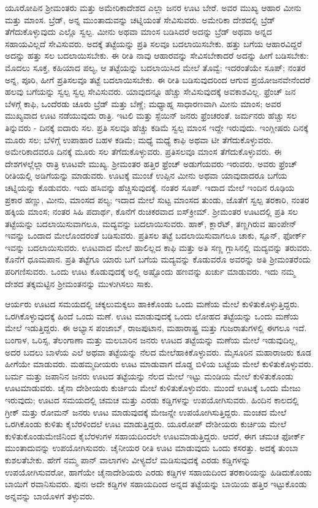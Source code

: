 ಯೂರೋಪಿನ ಶ‍್ರೀಮಂತರು ಮತ್ತು ಅಮೇರಿಕಾದೇಶದ ಎಲ್ಲಾ ಜನರ ಊಟ ಬೇರೆ. ಅವರ ಮುಖ್ಯ ಆಹಾರ ಮೀನು ಮತ್ತು ಮಾಂಸ. ಬ್ರೆಡ್​, ಅನ್ನ ಮುಂತಾದುವನ್ನು ಚಟ್ನಿಯಂತೆ ಸೇವಿಸುವರು. ಅಮೇರಿಕಾ ದೇಶದಲ್ಲಿ ಬ್ರೆಡ್​ ತೆಗೆದುಕೊಳ್ಳುವುದು ಎಲ್ಲೊ ಸ್ವಲ್ಪ. ಮೀನು ಅಥವಾ ಮಾಂಸ ಬಡಿಸಿದರೆ ಅದನ್ನು ಬ್ರೆಡ್​ ಅಥವಾ ಅನ್ನದ ಸಹಾಯವಿಲ್ಲದೆ ಸೇವಿಸುವರು. ಅದಕ್ಕೆ ತಟ್ಟೆಯನ್ನು ಪ್ರತಿ ಸಲವೂ ಬದಲಾಯಿಸಬೇಕು. ಹತ್ತು ಬಗೆಯ ಆಹಾರವಿದ್ದರೆ ಅದನ್ನು ಹತ್ತು ಸಲ ಬದಲಾಯಿಸಬೇಕು. ಈ ರೀತಿ ನಾವು ಆಹಾರವನ್ನು ಸೇವಿಸಬೇಕಾದರೆ ಅದನ್ನು ಹೀಗೆ ಬಡಿಸಬೇಕು: ಮೊದಲು ಸೂಕ್ತ, ಕಹಿಯಾದ ಪಲ್ಯ, ಆ ತಟ್ಟೆಯನ್ನು ಬದಲಾಯಿಸಿದ ಮೇಲೆ ತೊವ್ವೆ; ಇದರಂತೆಯೇ ಸೂಪ್​; ನಂತರ ಅನ್ನ, ಪೂರಿ, ಹೀಗೆ ಪ್ರತಿಸಲವೂ ತಟ್ಟೆ ಬದಲಾಯಿಸಬೇಕು. ಈ ರೀತಿ ಬಡಿಸುವುದರಿಂದ ಆಗುವ ಪ್ರಯೋಜನವೇನೆಂದರೆ ಹಲವು ಬಗೆಯನ್ನು ಸ್ವಲ್ಪ ಸ್ವಲ್ಪ ಸೇವಿಸುವರು. ಯಾವುದನ್ನೂ ಹೆಚ್ಚು ಸೇವಿಸುವುದಕ್ಕೆ ಅವಕಾಶವಿಲ್ಲ. ಫ್ರೆಂಚ್​ ಜನ ಬೆಳಗ್ಗೆ ಕಾಫಿ, ಒಂದೆರಡು ಚೂರು ಬ್ರೆಡ್​ ಮತ್ತು ಬೆಣ್ಣೆ; ಮಧ್ಯಾಹ್ನ ಸಾಧಾರಣವಾಗಿ ಮೀನು ಮಾಂಸ; ಅವರ ಮುಖ್ಯವಾದ ಊಟ ನಡೆಯುವುದು ರಾತ್ರಿ. ಇಟಲಿ ಮತ್ತು ಸ್ಪೆಯಿನ್​ ಜನರು ಫ್ರೆಂಚರಂತೆ. ಜರ್ಮನರು ಹೆಚ್ಚು ಸಲ ತಿನ್ನುವರು - ದಿನಕ್ಕೆ ಐದಾರು ಸಲ. ಪ್ರತಿ ಸಲವೂ ಹೆಚ್ಚು ಕಡಿಮೆ ಸ್ವಲ್ಪ ಮಾಂಸ ಇದ್ದೇ ಇರುವುದು. ಇಂಗ್ಲೀಷರು ದಿನಕ್ಕೆ ಮೂರು ಸಲ; ಬೆಳಿಗ್ಗೆ ಉಪಾಹಾರ ಬಹಳ ಕಡಿಮೆ; ಮಧ್ಯೆ ಮಧ್ಯೆ ಕಾಫಿ ಅಥವಾ ಟೀ ತೆಗೆದುಕೊಳ್ಳುವರು. ಅಮೇರಿಕಾದವರೂ ದಿನಕ್ಕೆ ಮೂರು ಸಲ ತೆಗೆದುಕೊಳ್ಳುವರು. ಪ್ರತಿಸಲವೂ ಮಾಂಸ ತೆಗೆದುಕೊಳ್ಳುವರು. ಈ ದೇಶಗಳಲ್ಲೆಲ್ಲಾ ರಾತ್ರಿ ಊಟವೇ ಮುಖ್ಯ. ಶ‍್ರೀಮಂತರ ಹತ್ತಿರ ಫ್ರೆಂಚ್​ ಅಡುಗೆಯವರು ಇರುವರು. ಅವರು ಫ್ರೆಂಚ್ ರೀತಿಯಲ್ಲಿ ಅಡಿಗೆಯನ್ನು ಮಾಡುವರು. ಊಟಕ್ಕೆ ಮುಂಚೆ ಉಪ್ಪಿನ ಮೀನು ಅಥವಾ ಯಾವುದಾದರೂ ಬಗೆಯ ಚಟ್ನಿಯನ್ನು ಕೊಡುವರು. ಇದು ಹಸಿವನ್ನು ಹೆಚ್ಚಿಸುವುದಕ್ಕೆ. ನಂತರ ಸೂಪ್​. ಇದಾದ ಮೇಲೆ ಇಂದಿನ ರೂಢಿಯ ಪ್ರಕಾರ ಹಣ್ಣು, ಮೀನು, ಮಾಂಸದ ಪಲ್ಯ; ಇದಾದ ಮೇಲೆ ಸುಟ್ಟ ಮಾಂಸದ ತುಂಡು, ಜೊತೆಗೆ ಸ್ವಲ್ಪ ತರಕಾರಿ, ನಂತರ ಹಕ್ಕಿಯ ಮಾಂಸ; ನಂತರ ಸಿಹಿ ಪದಾರ್ಥ, ಕೊನೆಗೆ ರುಚಿಕರವಾದ ಐಸ್​ಕ್ರೀಮ್​. ಶ‍್ರೀಮಂತರ ಊಟದಲ್ಲಿ ಪ್ರತಿ ಸಲ ತಟ್ಟೆಯನ್ನು ಬದಲಾಯಿಸುವಾಗಲೂ, ಮದ್ಯವನ್ನು ಬದಲಾಯಿಸುವರು. ಹಾಕ್​, ಕ್ಲಾರೆಟ್​, ತಣ್ಣಗಿರುವ ಷಾಂಪೇನ್​ ಇವನ್ನು ಒಂದಾದ ಮೇಲೊಂದರಂತೆ ಬಡಿಸುವರು. ಪ್ರತಿಸಲ ತಟ್ಟೆ ಬದಲಾಯಿಸುವಾಗಲೂ ಚಾಕು, ಸ್ಪೂನ್​, ಫೋರ್ಕ್​ ಇವನ್ನು ಬದಲಾಯಿಸುವರು. ಊಟವಾದ ಮೇಲೆ ಹಾಲಿಲ್ಲದ ಕಾಫಿ ಮತ್ತು ಅತಿ ಸಣ್ಣ ಗ್ಲಾಸಿನಲ್ಲಿ ಮದ್ಯವನ್ನು ತರುವರು. ಕೊನೆಗೆ ಧೂಮಪಾನ. ಪ್ರತಿ ತಟ್ಟೆಗೂ ಯಾರು ಬಗೆ ಬಗೆಯ ಮದ್ಯವನ್ನು ಕೊಡುವರೊ ಅವರನ್ನು ಅತಿ ಶ‍್ರೀಮಂತರೆಂದು ಪರಿಗಣಿಸುವರು. ಒಂದು ಊಟ ಕೊಡುವುದಕ್ಕೆ ಅಲ್ಲಿ ಅಷ್ಟೊಂದು ಹಣವನ್ನು ಖರ್ಚು ಮಾಡುವರು. ಇದು ನಮ್ಮ ದೇಶದ ತಕ್ಕಮಟ್ಟಿನ ಶ‍್ರೀಮಂತನನ್ನು ಮುಳುಗಿಸಲು ಸಾಕು.

ಆರ್ಯರು ಊಟದ ಸಮಯದಲ್ಲಿ ಚಕ್ಕಲುಮಕ್ಕಲು ಹಾಕಿಕೊಂಡು ಒಂದು ಮಣೆಯ ಮೇಲೆ ಕುಳಿತುಕೊಳ್ಳುತ್ತಿದ್ದರು. ಒರಗಿಕೊಳ್ಳುವುದಕ್ಕೆ ಹಿಂದೆ ಒಂದು ಮಣೆ. ಊಟ ಮಾಡುವುದಕ್ಕೆ ಒಂದು ಲೋಹದ ತಟ್ಟೆಯನ್ನು ಒಂದು ಮಣೆಯ ಮೇಲೆ ಇಡುತ್ತಿದ್ದರು. ಈ ಅಭ್ಯಾಸ ಪಂಜಾಬ್​, ರಾಜಪುಟಾನ, ಮಹಾರಾಷ್ಟ್ರ ಮತ್ತು ಗುಜರಾತುಗಳಲ್ಲಿ ಈಗಲೂ ಇದೆ. ಬಂಗಾಳ, ಒರಿಸ್ಸ, ತೆಲಂಗಾಣಾ ಮತ್ತು ಮಲಬಾರಿನ ಜನರು ಊಟದ ತಟ್ಟೆಯನ್ನು ಮಣೆಯ ಮೇಲೆ ಇಡುವುದಿಲ್ಲ, ಅದರ ಬದಲು ಬಾಳೆಯ ಎಲೆ ಅಥವಾ ತಟ್ಟೆಯನ್ನು ನೆಲದ ಮೇಲೆಹಾಕಿಕೊಳ್ಳುವರು. ಮೈಸೂರಿನ ಮಹಾರಾಜರು ಕೂಡ ಹೀಗೆಯೇ ಮಾಡುವರು. ಮಹಮ್ಮದೀಯರು ಊಟ ಮಾಡುವಾಗ ದೊಡ್ಡ ಬಿಳಿಯ ಬಟ್ಟೆಯ ಮೇಲೆ ಕುಳಿತುಕೊಳ್ಳುವರು. ಬರ್ಮ ಮತ್ತು ಜಪಾನಿನ ಜನರು ಊಟದ ತಟ್ಟೆಯನ್ನು ನೆಲದ ಮೇಲೆ ಇಟ್ಟು ಮಂಡಿಯ ಮೇಲೆ ಕುಳಿತುಕೊಂಡು ಊಟಮಾಡುವರು. ಚೈನಾ ದೇಶೀಯರು ಕುರ್ಚಿಯ ಮೇಲೆ ಕುಳಿತುಕೊಳ್ಳುವರು. ಮುಂದೆ ಊಟಕ್ಕೆ ಒಂದು ಮೇಜು ಇರುವುದು; ಊಟದ ಸಮಯದಲ್ಲಿ ಚಮಚ ಮತ್ತು ಎರಡು ಕಡ್ಡಿಗಳನ್ನು ಉಪಯೋಗಿಸುವರು. ಹಿಂದಿನ ಕಾಲದಲ್ಲಿ ಗ್ರೀಕ್​ ಮತ್ತು ರೋಮನ್​ ಜನರು ಊಟ ಮಾಡುವುದಕ್ಕೆ ಮೇಜನ್ನೇ ಉಪಯೋಗಿಸುತ್ತಿದ್ದರು. ಮಂಚದ ಮೇಲೆ ಒರಗಿಕೊಂಡು ಕುಳಿತು ಕೈಬೆರಳಿಂದಲೆ ಊಟ ಮಾಡುತ್ತಿದ್ದರು. ಯೂರೋಪ್​ ದೇಶೀಯರು ಕುರ್ಚಿಯ ಮೇಲೆ ಕುಳಿತುಕೊಂಡು\break ಮೇಜಿನಿಂದ ಕೈಬೆರಳುಗಳ ಸಹಾಯದಿಂದಲೇ ಊಟಮಾಡುತ್ತಿದ್ದರು. ಆದರೆ, ಈಗ ಚಮಚ ಫೋರ್ಕ್​ ಮುಂತಾದುವನ್ನು ಉಪಯೋಗಿಸುವರು. ಚೈನೀಯರ ರೀತಿ ಊಟ ಮಾಡುವುದು ಒಂದು ಕಸರತ್ತು. ಅದಕ್ಕೆ ತುಂಬಾ ಕುಶಲತೆಬೇಕು. ಹೇಗೆ ನಮ್ಮ ಪಾನ್ ವಾಲಾಗಳು ವೀಳ್ಯದೆಲೆ ಮಡಿಸುವುದಕ್ಕೆ ಎರಡು ಕಡ್ಡಿಗಳನ್ನು ಉಪಯೋಗಿಸುವರೋ, ಹಾಗೆಯೇ ಚೈನಾದೇಶಿಯರು ಎರಡು ಕಡ್ಡಿಗಳ ಸಹಾಯದಿಂದ ತರಕಾರಿಯನ್ನು ಹಿಡಿದುಕೊಂಡು ಬಾಯಿಗೆ ರವಾನಿಸುವರು. ಪುನಃ ಅದೇ ಕಡ್ಡಿಗಳ ಸಹಾಯದಿಂದ ಅನ್ನದ ತಟ್ಟೆಯನ್ನು ಬಾಯಿಯ ಹತ್ತಿರ ಇಟ್ಟುಕೊಂಡು ಅನ್ನವನ್ನು ಬಾಯೊಳಗೆ ತಳ್ಳುವರು.

